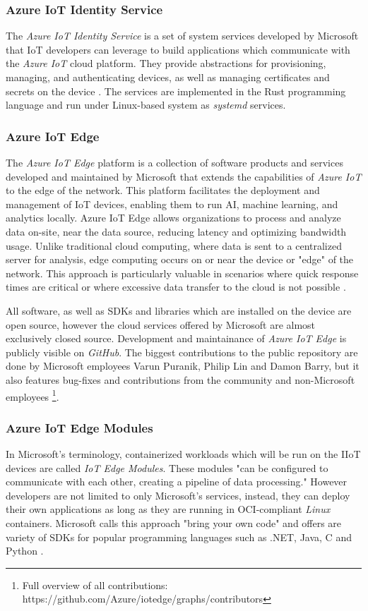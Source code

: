 \subsubsection{Azure IoT Identity Service}
The \textit{Azure IoT Identity Service} is a set of system services developed
by Microsoft that \ac{IoT} developers can leverage to build applications which
communicate with the \textit{Azure IoT} cloud platform. They provide abstractions
for provisioning, managing, and authenticating devices, as well as managing
certificates and secrets on the device \cite{aiiot}. The services are implemented
in the Rust programming language and run under Linux-based system as \textit{systemd}
services.


\subsubsection{Azure IoT Edge}
The \textit{Azure IoT Edge} platform is a collection of software products and
services developed and maintained by Microsoft that extends the capabilities
of \textit{Azure IoT} to the edge of the network. This platform facilitates the
deployment and management of \ac{IoT} devices, enabling them to run \ac{AI},
machine learning, and analytics locally. Azure IoT Edge allows organizations to
process and analyze data on-site, near the data source, reducing latency and
optimizing bandwidth usage.
Unlike traditional cloud computing, where data is sent to a centralized server
for analysis, edge computing occurs on or near the device or "edge" of the
network. This approach is particularly valuable in scenarios where quick
response times are critical or where excessive data transfer to the cloud
is not possible \cite{msdoc-aziotedge}.

All software, as well as \ac{SDK}s and
libraries which are installed on the device are open source, however the
cloud services offered by Microsoft are almost exclusively closed source.
Development and maintainance of \textit{Azure IoT Edge} is publicly visible on
\textit{GitHub}. The biggest contributions
to the public repository are done by Microsoft employees Varun Puranik,
Philip Lin and Damon Barry, but it also features bug-fixes and contributions
from the community and non-Microsoft employees
\footnote{Full overview of all contributions: https://github.com/Azure/iotedge/graphs/contributors}.

\subsubsection{Azure IoT Edge Modules}
In Microsoft's terminology, containerized workloads which will be run on the \ac{IIoT}
devices are called \textit{IoT Edge Modules}. These modules "can be configured to
communicate with each other, creating a pipeline of data processing." However developers are
not limited to only Microsoft's services, instead, they can deploy their own
applications as long as they are running in \ac{OCI}-compliant \textit{Linux} containers.
Microsoft calls this approach "bring your own code" and offers are variety of
\ac{SDK}s for popular programming languages such as .NET, Java, C and Python
\cite{msdoc-supportetplatforms}.


